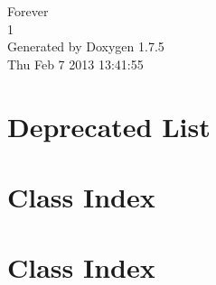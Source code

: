 \documentclass[a4paper]{book}
\begin{document}
\hypersetup{pageanchor=false,citecolor=blue}
\begin{titlepage}
\vspace*{7cm}
\begin{center}
{\Large \-Forever \\[1ex]\large 1 }\\
\vspace*{1cm}
{\large \-Generated by Doxygen 1.7.5}\\
\vspace*{0.5cm}
{\small Thu Feb 7 2013 13:41:55}\\
\end{center}
\end{titlepage}
\clearemptydoublepage
{}
\tableofcontents
\clearemptydoublepage
{}
\hypersetup{pageanchor=true,citecolor=blue}
\chapter{\-Deprecated \-List}
\label{deprecated}
\hypertarget{deprecated}{}

\chapter{\-Class \-Index}

\chapter{\-Class \-Index}

\end{document}
